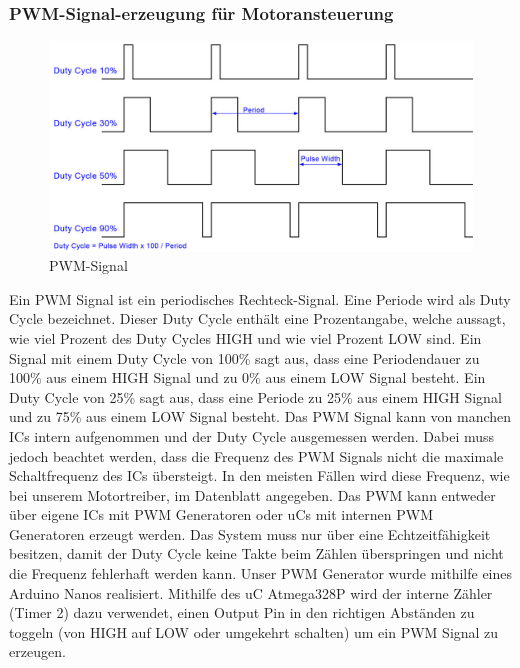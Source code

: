 \subsubsection{PWM-Signal-erzeugung für Motoransteuerung}
\begin{figure}[H] 
\begin{center}

\includegraphics[width=12cm]{Bilder/PWM/Duty_Cycle}
\caption{PWM-Signal}
\label{PWM_Signal}

\end{center}
\end{figure}
Ein \ac{PWM} Signal ist ein periodisches Rechteck-Signal. Eine Periode wird als Duty Cycle bezeichnet. Dieser Duty Cycle enthält eine Prozentangabe, welche aussagt, wie viel Prozent des Duty Cycles HIGH und wie viel Prozent LOW sind. Ein Signal mit einem Duty Cycle von 100\% sagt aus, dass eine Periodendauer zu 100\% aus einem HIGH Signal und zu 0\% aus einem LOW Signal besteht. Ein Duty Cycle von 25\% sagt aus, dass eine Periode zu 25\% aus einem HIGH Signal und zu 75\% aus einem LOW Signal besteht. Das \ac{PWM} Signal kann von manchen ICs intern aufgenommen und der Duty Cycle ausgemessen werden. Dabei muss jedoch beachtet werden, dass die Frequenz des \ac{PWM} Signals nicht die maximale Schaltfrequenz des ICs übersteigt. In den meisten Fällen wird diese Frequenz, wie bei unserem Motortreiber, im Datenblatt angegeben. Das \ac{PWM} kann entweder über eigene ICs mit \ac{PWM} Generatoren oder \ac{uC}s mit internen \ac{PWM} Generatoren erzeugt werden. Das System muss nur über eine Echtzeitfähigkeit besitzen, damit der Duty Cycle keine Takte beim Zählen überspringen und nicht die Frequenz fehlerhaft werden kann. 
Unser \ac{PWM} Generator wurde mithilfe eines Arduino Nanos realisiert. Mithilfe des \ac{uC} Atmega328P wird der interne Zähler (Timer 2) dazu verwendet, einen Output Pin in den richtigen Abständen zu toggeln (von HIGH auf LOW oder umgekehrt schalten) um ein \ac{PWM} Signal zu erzeugen.


